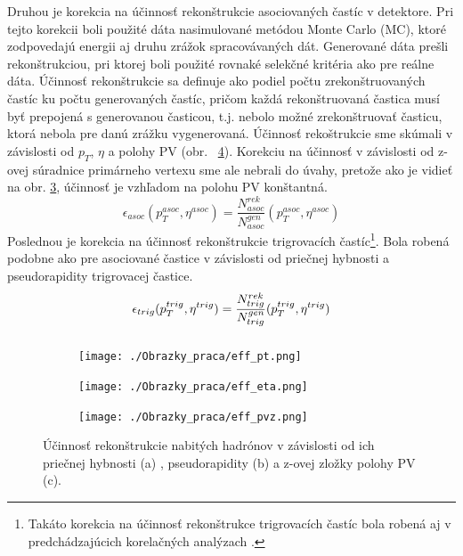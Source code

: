 \documentclass[thesismargins, thesislinespacing]{rnthesis}
\begin{document}
Druhou je korekcia na účinnosť rekonštrukcie asociovaných častíc v detektore. Pri tejto korekcii boli použité dáta nasimulované metódou Monte Carlo (MC), ktoré zodpovedajú energii aj druhu zrážok spracovávaných dát. Generované dáta prešli re\-kon\-štruk\-ciou, pri ktorej boli použité rovnaké selekčné kritéria ako pre reálne dáta. Účinnosť re\-kon\-štruk\-cie sa definuje ako podiel počtu zrekonštruovaných častíc ku počtu generovaných častíc, pričom každá rekonštruovaná častica musí byť prepojená s generovanou časticou, t.j. nebolo možné zrekonštruovať časticu, ktorá nebola pre danú zrážku vygenerovaná. Účinnosť rekoštrukcie sme skúmali v závislosti od $p_T$, $\eta$ a polohy PV (obr. ~\ref{uc}). Korekciu na účinnosť v závislosti od z-ovej súradnice primárneho vertexu sme ale nebrali do úvahy, pretože ako je vidieť na obr. \ref{ucpvz}, účinnosť je vzhľadom na polohu PV konštantná.    
\begin{equation}
\epsilon_{asoc}(p_{T}^{asoc},\eta^{asoc}) = \frac{N_{asoc}^{rek}}{N_{asoc}^{gen}}(p_{T}^{asoc},\eta^{asoc})
\end{equation}
Poslednou je korekcia na účinnosť rekonštrukcie trigrovacích častíc\footnote{Takáto korekcia na účinnosť rekonštrukce trigrovacích častíc bola robená aj v predchádzajúcich korelačných analýzach \cite{Jan-Fiete}.}. Bola robená podobne ako pre asociované častice v závislosti od priečnej hybnosti a pseudorapidity trigrovacej častice.  
\begin{equation}
\footnotesize
\epsilon_{trig}(p_{T}^{trig},\eta^{trig}) = \frac{N_{trig}^{rek}}{N_{trig}^{gen}}(p_{T}^{trig},\eta^{trig})
\end{equation}
\begin{equation}\end{equation}


\begin{figure}[hbtp!]
	\centering
	\begin{subfigure}{0.33\textwidth}
		\centering
		\texttt{[image: ./Obrazky\_praca/eff\_pt.png]}
		\caption{}
		\label{}
	\end{subfigure}%
	\begin{subfigure}{0.33\textwidth}
		\centering
		\texttt{[image: ./Obrazky\_praca/eff\_eta.png]}
		\caption{}
		\label{}
	\end{subfigure}
\begin{subfigure}{0.33\textwidth}
	\centering
	\texttt{[image: ./Obrazky\_praca/eff\_pvz.png]}
	\caption{}
	\label{ucpvz}
\end{subfigure}
	\caption{Účinnosť rekonštrukcie nabitých hadrónov v závislosti od ich priečnej hybnosti (a) , pseudorapidity (b) a z-ovej zložky polohy PV (c).}
	\label{uc}
\end{figure}
\end{document}
